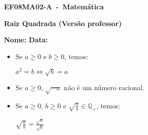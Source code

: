 \documentclass[a4paper,14pt]{article}
\begin{document}
	
	\noindent\textbf{EF08MA02-A~-~Matemática} 
	
	\begin{center}
		\textbf{Raiz Quadrada (Versão professor)}
	\end{center}
	
	\bigskip
	
	\noindent\textbf{Nome:} \underline{\hspace{10cm}}
    \noindent\textbf{Data:} \underline{\hspace{4cm}}
	
	\bigskip
	
	\begin{multicols}{2}
	\begin{itemize}
		\item Se $a \geq 0$ e $b \geq 0$, temos:
		\begin{center}
			$a^2 = b \Leftrightarrow \sqrt{b} = a$
		\end{center}
	    \item Se $a \geq 0$, $\sqrt{-a}$ não é um número racional.
	    \item Se $a \geq 0$, $b \geq 0$ e $\sqrt{\frac{a}{b}} \in \mathbb{Q_+}$, temos:
	    \begin{center}
	    	$\sqrt{\frac{a}{b}} = \frac{\sqrt{a}}{\sqrt{b}}$
	    \end{center}  
	\end{itemize}
	\begin{enumerate}
		

\end{enumerate}
\end{multicols}
\end{document}
